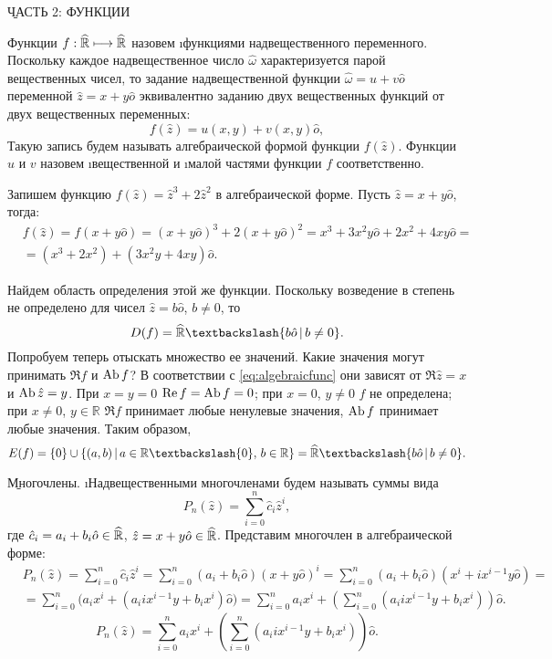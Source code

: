 \begin{center}
	\b{ЧАСТЬ 2: ФУНКЦИИ}
\end{center}

Функции $f: \widehat{\mathbb{R}} \longmapsto \widehat{\mathbb{R}}$ назовем \i{функциями надвещественного переменного}. Поскольку каждое надвещественное число $\hat{\omega}$ характеризуется парой вещественных чисел, то задание надвещественной функции $\hat{\omega}=u+v\hat{o}$ переменной $\hat{z}=x+y\hat{o}$ эквивалентно заданию двух вещественных функций от двух вещественных переменных:
\begin{equation}\label{eq:algebraicfunc}
	f(\hat{z})=u(x, y)+v(x, y)\hat{o},
\end{equation}
Такую запись будем называть алгебраической формой функции $f(\hat{z})$. Функции $u$ и $v$ назовем \i{вещественной} и \i{малой} частями функции $f$ соответственно.
\begin{example}
	Запишем функцию $f(\hat{z})=\hat{z}^3+2\hat{z}^2$ в алгебраической форме. Пусть $\hat{z}=x+y\hat{o}$, тогда:
	\begin{eqnarray*}
		&f(\hat{z})=f(x+y\hat{o})=(x+y\hat{o})^3+2(x+y\hat{o})^2=x^3+3x^2y\hat{o}+2x^2+4xy\hat{o}=      \\ &=(x^3+2x^2)+(3x^2y+4xy)\hat{o}.
	\end{eqnarray*}
\end{example}
\begin{example}
	Найдем область определения этой же функции. Поскольку возведение в степень не определено для чисел $\hat{z}=b\hat{o}$, $b\neq 0$, то 
		$$D(f)=\AbR\textbackslash\{b\hat{o}\,|\,b\neq 0\}.$$
	Попробуем теперь отыскать множество ее значений. Какие значения могут принимать $\Re{f}$ и $\operatorname{Ab}{f}$? В соответствии с \eqref{eq:algebraicfunc} они зависят от $\Re{\hat{z}}=x$ и $\operatorname{Ab}{\hat{z}}=y$. При $x=y=0$ $\operatorname{Re} f=\operatorname{Ab}{f}=0$; при $x=0$, $y\neq 0$ $f$ не определена; при $x\neq 0$, $y\in\mathbb{R}$ $\Re{f}$ принимает любые ненулевые значения, $\operatorname{Ab}{f}$ принимает любые значения. Таким образом, 
		$$E(f)=\{0\}\cup\{(a, b)\,|\,a\in\mathbb{R}\textbackslash\{0\},\,b\in\mathbb{R}\}\hm=\AbR\textbackslash\{b\hat{o}\,|\,b\neq 0\}.$$
\end{example}
\b{Многочлены.} \i{Надвещественными многочленами} будем называть суммы вида
	\begin{equation}\label{eq:polynomdef}
		P_n (\hat{z})=\sum_{i=0}^n \hat{c}_i\hat{z}^i,
	\end{equation}
где $\hat{c}_i=a_i+b_i\hat{o}\in\widehat{\mathbb{R}}$, $\hat{z}=x+y\hat{o}\in\widehat{\mathbb{R}}$. Представим многочлен в алгебраической форме:
	\begin{eqnarray*}
		& P_n(\hat{z})=\sum\limits_{i=0}^n \hat{c}_i\hat{z}^i=\sum\limits_{i=0}^n (a_i+b_i\hat{o})(x+y\hat{o})^i=\sum\limits_{i=0}^n (a_i+b_i\hat{o})(x^i+ix^{i-1}y\hat{o})=\\
		& =\sum\limits_{i=0}^n \big(a_ix^i+(a_iix^{i-1}y+b_ix^i)\hat{o}\big)=\sum\limits_{i=0}^n a_ix^i+\left(\sum\limits_{i=0}^n (a_iix^{i-1}y+b_ix^i)\right)\hat{o}.
	\end{eqnarray*}
	\begin{equation}\label{eq:algebraicpolynom}
		P_n(\hat{z})=\sum_{i=0}^n a_ix^i+\left(\sum_{i=0}^n (a_iix^{i-1}y+b_ix^i)\right)\hat{o}.
	\end{equation}


